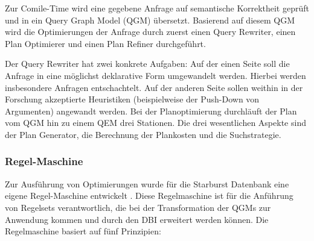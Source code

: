 Zur Comile-Time wird eine gegebene Anfrage auf semantische Korrektheit geprüft und in ein Query Graph Model (QGM) übersetzt. Basierend auf diesem QGM wird die Optimierungen der Anfrage durch zuerst einen Query Rewriter, einen Plan Optimierer und einen Plan Refiner durchgeführt.

Der Query Rewriter hat zwei konkrete Aufgaben: Auf der einen Seite soll die Anfrage in eine möglichst deklarative Form umgewandelt werden. Hierbei werden insbesondere Anfragen entschachtelt. Auf der anderen Seite sollen weithin in der Forschung akzeptierte Heuristiken (beispielweise der Push-Down von Argumenten) angewandt werden.
Bei der Planoptimierung durchläuft der Plan vom QGM hin zu einem QEM drei Stationen. Die drei wesentlichen Aspekte sind der Plan Generator, die Berechnung der Plankosten und die Suchstrategie. 

\subsubsection{Regel-Maschine}

Zur Ausführung von Optimierungen wurde für die Starburst Datenbank eine eigene Regel-Maschine entwickelt \cite{lohman1988Starbust}. Diese Regelmaschine ist für die Anführung von Regelsets verantwortlich, die bei der Transformation der QGMs zur Anwendung kommen und durch den DBI  erweitert werden können. Die Regelmaschine basiert auf fünf Prinzipien:

